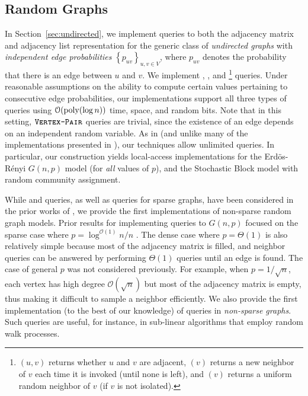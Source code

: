\subsection{Random Graphs}%
\label{sec:random_graphs}
In Section~\ref{sec:undirected}, we implement queries to both the adjacency matrix and adjacency list representation
for the generic class of \emph{undirected graphs} with {\em independent edge probabilities} $\left\{ p_{uv} \right\}_{u,v\in V}$,
where $p_{uv}$ denotes the probability that there is an edge between $u$ and $v$.
We implement , , and 
\footnote{$(u,v)$ returns whether $u$ and $v$ are adjacent, $(v)$ returns a new neighbor of $v$ each time
it is invoked (until none is left), and $(v)$ returns a uniform random neighbor of $v$ (if $v$ is not isolated).} queries.
Under reasonable assumptions on the ability to compute certain values pertaining to consecutive edge probabilities,
our implementations support all three types of queries using $\mathcal{O}(\mathrm{poly}(\log n))$ time, space, and random bits.
Note that in this setting, $\texttt{\textsc{Vertex-Pair}}$ queries are trivial, since the existence of an edge depends on an independent random variable.
As in \cite{reut} (and unlike many of the implementations presented in \cite{huge_old,huge}), our techniques allow unlimited queries.
In particular, our construction yields local-access implementations for the Erd\"{o}s-R\'{e}nyi $G(n,p)$ model (for \emph{all} values of $p$),
and the Stochastic Block model with random community assignment.


While  and  queries, as well as  queries for sparse graphs,
have been considered in the prior works of \cite{reut, huge_old, huge, sparse},
we provide the first implementations of non-sparse random graph models.
Prior results for implementing queries to $G(n,p)$ focused on the sparse case where $p = \log^{\mathcal O(1)} n/n$ \cite{sparse}.
The dense case where $p = \Theta(1)$ is also relatively simple because most of the adjacency matrix is filled,
and neighbor queries can be answered by performing $\Theta(1)$  queries until an edge is found.
The case of general $p$ was not considered previously.
For example, when $p = 1/\sqrt{n}$, each vertex has high degree $\mathcal O(\sqrt{n})$ but most of the adjacency matrix is empty,
thus making it difficult to sample a neighbor efficiently.
We also provide the first implementation (to the best of our knowledge) of  queries in \emph{non-sparse graphs}.
Such queries are useful, for instance, in sub-linear algorithms that employ random walk processes.


